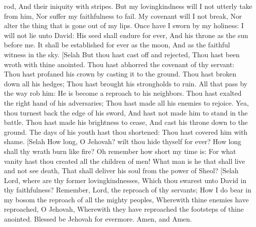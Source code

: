 rod, And their iniquity with stripes.  But my lovingkindness will I not utterly take from him, Nor suffer my faithfulness to fail.  My covenant will I not break, Nor alter the thing that is gone out of my lips.  Once have I sworn by my holiness: I will not lie unto David:  His seed shall endure for ever, And his throne as the sun before me.  It shall be established for ever as the moon, And as the faithful witness in the sky. [Selah  But thou hast cast off and rejected, Thou hast been wroth with thine anointed.  Thou hast abhorred the covenant of thy servant: Thou hast profaned his crown by casting it to the ground.  Thou hast broken down all his hedges; Thou hast brought his strongholds to ruin.  All that pass by the way rob him: He is become a reproach to his neighbors.  Thou hast exalted the right hand of his adversaries; Thou hast made all his enemies to rejoice.  Yea, thou turnest back the edge of his sword, And hast not made him to stand in the battle.  Thou hast made his brightness to cease, And cast his throne down to the ground.  The days of his youth hast thou shortened: Thou hast covered him with shame. [Selah  How long, O Jehovah? wilt thou hide thyself for ever? How long shall thy wrath burn like fire?  Oh remember how short my time is: For what vanity hast thou created all the children of men!  What man is he that shall live and not see death, That shall deliver his soul from the power of Sheol? [Selah  Lord, where are thy former lovingkindnesses, Which thou swarest unto David in thy faithfulness?  Remember, Lord, the reproach of thy servants; How I do bear in my bosom the reproach of all the mighty peoples,  Wherewith thine enemies have reproached, O Jehovah, Wherewith they have reproached the footsteps of thine anointed.  Blessed be Jehovah for evermore. Amen, and Amen. 


